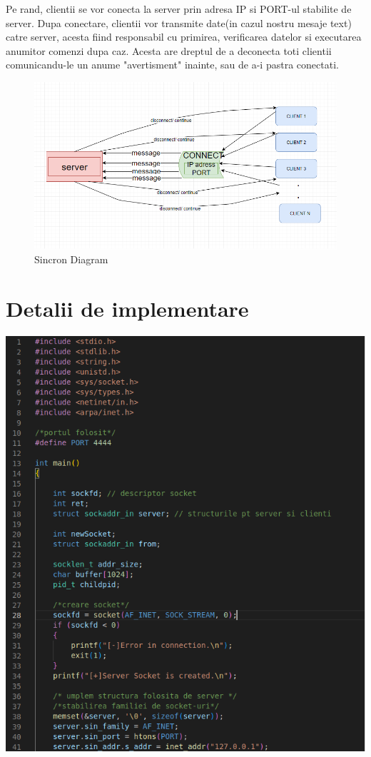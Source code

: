\documentclass{article}
\begin{document}
    Pe rand, clientii se vor conecta la server prin adresa IP si PORT-ul stabilite de server. Dupa conectare, clientii vor transmite date(in cazul nostru mesaje text) catre server, acesta fiind responsabil cu primirea, verificarea datelor si executarea anumitor comenzi dupa caz. Acesta are dreptul de a deconecta toti clientii comunicandu-le un anume "avertisment" inainte, sau de a-i pastra conectati.
   

\begin{figure}[t]
\begin{center}
    \includegraphics[width=\textwidth]{desen-bun.png}
\end{center}
\caption {Sincron Diagram}
\end{figure}


\section{Detalii de implementare}

    \includegraphics[width=\textwidth]{cod1.png}
\end{document}
